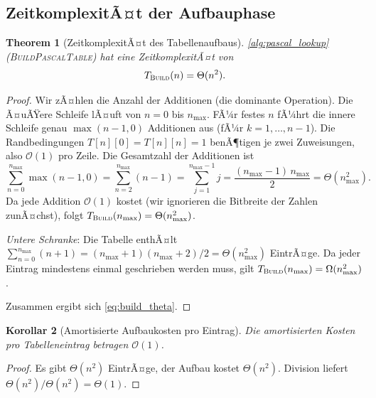 ﻿\documentclass[12pt, a4paper]{article}
\newcommand{\Oh}{\mathcal{O}}
\newcommand{\build}{\textsc{Build}}
\theoremstyle{plain}
\newtheorem{theorem}{Theorem}[section]
\newtheorem{korollar}[theorem]{Korollar}
\theoremstyle{definition}
\theoremstyle{remark}
\renewcommand{\Oh}{\mathcal{O}}
\renewcommand{\build}{\textsc{Build}}
\begin{document}
\subsection{ZeitkomplexitÃ¤t der Aufbauphase}

\begin{theorem}[ZeitkomplexitÃ¤t des Tabellenaufbaus]
  \label{thm:aufbau_zeit}
  \cref{alg:pascal_lookup} (\textsc{BuildPascalTable}) hat eine
  ZeitkomplexitÃ¤t von
  \begin{equation}
    T_{\build}(n) = \Theta(n^2).
    \label{eq:build_theta}
  \end{equation}
\end{theorem}

\begin{proof}
  Wir zÃ¤hlen die Anzahl der Additionen (die dominante Operation).
  Die Ã¤uÃŸere Schleife lÃ¤uft von $n = 0$ bis $n_{\max}$. FÃ¼r festes $n$
  fÃ¼hrt die innere Schleife genau $\max(n-1, 0)$ Additionen aus
  (fÃ¼r $k = 1, \ldots, n-1$). Die Randbedingungen $T[n][0] = T[n][n] = 1$
  benÃ¶tigen je zwei Zuweisungen, also $\Oh(1)$ pro Zeile. Die
  Gesamtzahl der Additionen ist
  \begin{equation}
    \sum_{n=0}^{n_{\max}} \max(n-1, 0)
    = \sum_{n=2}^{n_{\max}} (n-1)
    = \sum_{j=1}^{n_{\max}-1} j
    = \frac{(n_{\max}-1)\,n_{\max}}{2}
    = \Theta(n_{\max}^2).
    \label{eq:aufbau_summe}
  \end{equation}
  Da jede Addition $\Oh(1)$ kostet (wir ignorieren die Bitbreite der
  Zahlen zunÃ¤chst), folgt $T_{\build}(n_{\max}) = \Theta(n_{\max}^2)$.

  \emph{Untere Schranke}: Die Tabelle enthÃ¤lt
  $\sum_{n=0}^{n_{\max}}(n+1) = (n_{\max}+1)(n_{\max}+2)/2 = \Theta(n_{\max}^2)$
  EintrÃ¤ge. Da jeder Eintrag mindestens einmal geschrieben werden muss,
  gilt $T_{\build}(n_{\max}) = \Omega(n_{\max}^2)$.

  Zusammen ergibt sich \eqref{eq:build_theta}.
\end{proof}

\begin{korollar}[Amortisierte Aufbaukosten pro Eintrag]
  \label{kor:amortisiert_aufbau}
  Die amortisierten Kosten pro Tabelleneintrag betragen $\Oh(1)$.
\end{korollar}

\begin{proof}
  Es gibt $\Theta(n^2)$ EintrÃ¤ge, der Aufbau kostet $\Theta(n^2)$.
  Division liefert $\Theta(n^2)/\Theta(n^2) = \Theta(1)$.
\end{proof}
\end{document}
